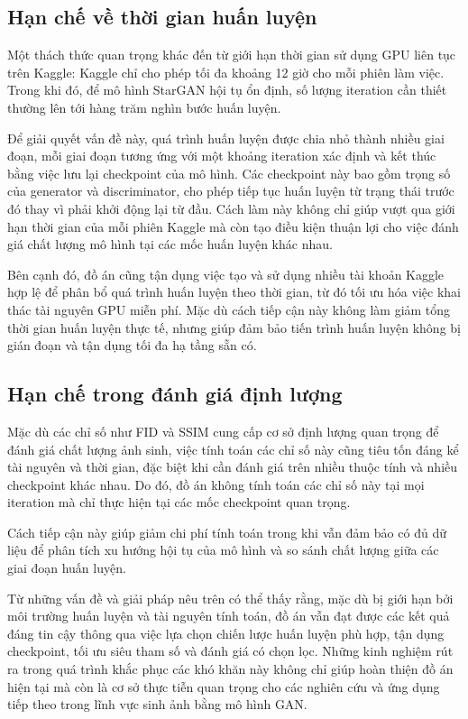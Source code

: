 \documentclass[../DoAn.tex]{subfiles}
\begin{document}
\subsection{Hạn chế về thời gian huấn luyện}

Một thách thức quan trọng khác đến từ giới hạn thời gian sử dụng GPU liên tục trên Kaggle: Kaggle chỉ cho phép tối đa khoảng 12 giờ cho mỗi phiên làm việc. Trong khi đó, để mô hình StarGAN hội tụ ổn định, số lượng iteration cần thiết thường lên tới hàng trăm nghìn bước huấn luyện.

Để giải quyết vấn đề này, quá trình huấn luyện được chia nhỏ thành nhiều giai đoạn, mỗi giai đoạn tương ứng với một khoảng iteration xác định và kết thúc bằng việc lưu lại checkpoint của mô hình. Các checkpoint này bao gồm trọng số của generator và discriminator, cho phép tiếp tục huấn luyện từ trạng thái trước đó thay vì phải khởi động lại từ đầu. Cách làm này không chỉ giúp vượt qua giới hạn thời gian của mỗi phiên Kaggle mà còn tạo điều kiện thuận lợi cho việc đánh giá chất lượng mô hình tại các mốc huấn luyện khác nhau.

Bên cạnh đó, đồ án cũng tận dụng việc tạo và sử dụng nhiều tài khoản Kaggle hợp lệ để phân bổ quá trình huấn luyện theo thời gian, từ đó tối ưu hóa việc khai thác tài nguyên GPU miễn phí. Mặc dù cách tiếp cận này không làm giảm tổng thời gian huấn luyện thực tế, nhưng giúp đảm bảo tiến trình huấn luyện không bị gián đoạn và tận dụng tối đa hạ tầng sẵn có.

\subsection{Hạn chế trong đánh giá định lượng}

Mặc dù các chỉ số như FID và SSIM cung cấp cơ sở định lượng quan trọng để đánh giá chất lượng ảnh sinh, việc tính toán các chỉ số này cũng tiêu tốn đáng kể tài nguyên và thời gian, đặc biệt khi cần đánh giá trên nhiều thuộc tính và nhiều checkpoint khác nhau. Do đó, đồ án không tính toán các chỉ số này tại mọi iteration mà chỉ thực hiện tại các mốc checkpoint quan trọng.

Cách tiếp cận này giúp giảm chi phí tính toán trong khi vẫn đảm bảo có đủ dữ liệu để phân tích xu hướng hội tụ của mô hình và so sánh chất lượng giữa các giai đoạn huấn luyện.


Từ những vấn đề và giải pháp nêu trên có thể thấy rằng, mặc dù bị giới hạn bởi môi trường huấn luyện và tài nguyên tính toán, đồ án vẫn đạt được các kết quả đáng tin cậy thông qua việc lựa chọn chiến lược huấn luyện phù hợp, tận dụng checkpoint, tối ưu siêu tham số và đánh giá có chọn lọc. Những kinh nghiệm rút ra trong quá trình khắc phục các khó khăn này không chỉ giúp hoàn thiện đồ án hiện tại mà còn là cơ sở thực tiễn quan trọng cho các nghiên cứu và ứng dụng tiếp theo trong lĩnh vực sinh ảnh bằng mô hình GAN.
\end{document}
